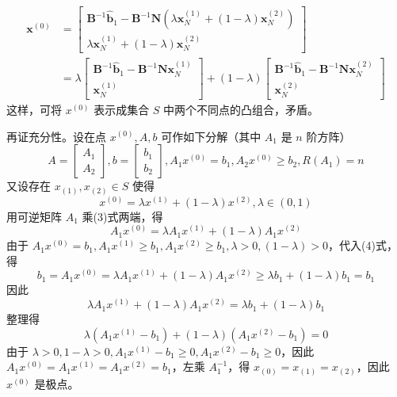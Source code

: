 \begin{solution}
    \begin{align*}
        \boldsymbol{x}^{(0)} &=\left[\begin{array}{c}
        \boldsymbol{B}^{-1} \hat{\boldsymbol{b}}_{1}-\boldsymbol{B}^{-1} \boldsymbol{N}\left(\lambda \boldsymbol{x}_{N}^{(1)}+(1-\lambda) \boldsymbol{x}_{N}^{(2)}\right) \\
        \lambda \boldsymbol{x}_{N}^{(1)}+(1-\lambda) \boldsymbol{x}_{N}^{(2)}
        \end{array}\right] \\
        &=\lambda\left[\begin{array}{c}
        \boldsymbol{B}^{-1} \hat{\boldsymbol{b}}_{1}-\boldsymbol{B}^{-1} \boldsymbol{N} \boldsymbol{x}_{N}^{(1)} \\
        \boldsymbol{x}_{N}^{(1)}
        \end{array}\right]+(1-\lambda)\left[\begin{array}{c}
        \mathbf{B}^{-1} \hat{\boldsymbol{b}}_{1}-\boldsymbol{B}^{-1} \boldsymbol{N} \boldsymbol{x}_{N}^{(2)} \\
        \boldsymbol{x}_{N}^{(2)}
        \end{array}\right]
    \end{align*}
    这样，可将 $x^{(0)}$ 表示成集合 $S$ 中两个不同点的凸组合，矛盾。

    再证充分性。设在点 $x^{(0)}, A, b$ 可作如下分解（其中 $A_1$ 是 $n$ 阶方阵）
    \[A = \begin{bmatrix}
        A_1 \\
        A_2
    \end{bmatrix}, b = \begin{bmatrix}
        b_1 \\ 
        b_2
    \end{bmatrix}, A_1x^{(0)} = b_1, A_2x^{(0)} \ge b_2, R(A_1) = n\]
    又设存在 $x_{(1)}, x_{(2)} \in S$ 使得
    \begin{equation}
        x^{(0)} = \lambda x^{(1)} + (1 - \lambda)x^{(2)}, \lambda \in (0, 1)
    \end{equation}
    用可逆矩阵 $A_1$ 乘(3)式两端，得
    \begin{equation}
        A_1x^{(0)} = \lambda A_1x^{(1)} + (1 - \lambda)A_1x^{(2)}
    \end{equation}
    由于 $A_1x^{(0)} = b_1, A_1x^{(1)} \ge b_1, A_1x^{(2)}\ge b_1, \lambda > 0, (1 - \lambda) > 0$，代入(4)式，得
    \[b_1 = A_1x^{(0)} = \lambda A_1x^{(1)} + (1 - \lambda)A_1x^{(2)} \ge \lambda b_1 + (1 - \lambda)b_1 = b_1\]
    因此
    \[\lambda A_1x^{(1)} + (1 - \lambda)A_1x^{(2)} = \lambda b_1 + (1 - \lambda)b_1\]
    整理得
    \[\lambda (A_1x^{(1)} - b_1) + (1 - \lambda)(A_1x^{(2)} - b_1) = 0\]
    由于 $\lambda > 0, 1 - \lambda > 0, A_1x^{(1)} - b_1 \ge 0, A_1x^{(2)} - b_1 \ge 0$，因此 $A_1x^{(0)} = A_1x^{(1)} = A_1x^{(2)} = b_1$，左乘 $A_1^{-1}$，得 $x_{(0)} = x_{(1)} = x_{(2)}$，因此 $x^{(0)}$ 是极点。
\end{solution}

